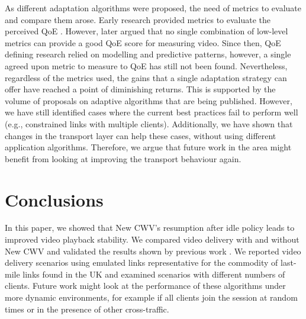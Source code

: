\documentclass[10pt,sigconf]{acmart}
\begin{document}
As different adaptation algorithms were proposed, the need of metrics to evaluate and compare them arose. Early research provided metrics to evaluate the perceived QoE \cite{Cranley-2006-user-perception-adapting-video}. However, later \cite{Balachandran-2012-quest-for-internet-video-qoe} argued that no single combination of low-level metrics can provide a good QoE score for measuring video. Since then, QoE defining research relied on modelling and predictive patterns, however, a single agreed upon metric to measure to QoE has still not been found. Nevertheless, regardless of the metrics used, the gains that a single adaptation strategy can offer have reached a point of diminishing returns. This is supported by the volume of proposals on adaptive algorithms that are being published. However, we have still identified cases where the current best practices fail to perform well (e.g., constrained links with multiple clients). Additionally, we have shown that changes in the transport layer can help these cases, without using different application algorithms. Therefore, we argue that future work in the area might benefit from looking at improving the transport behaviour again. 


%
% 



\section{Conclusions}


In this paper, we showed that New CWV's resumption after idle policy leads to improved video playback stability. We compared video delivery with and without New CWV and validated the results shown by previous work \cite{Nazir-2014-performance-evaluation-congestion-window-validation-dash-newcwv}. We reported video delivery scenarios using emulated links representative for the commodity of last-mile links found in the UK and examined scenarios with different numbers of clients. Future work might look at the performance of these algorithms under more dynamic environments, for example if all clients join the session at random times or in the presence of other cross-traffic. 
\end{document}
